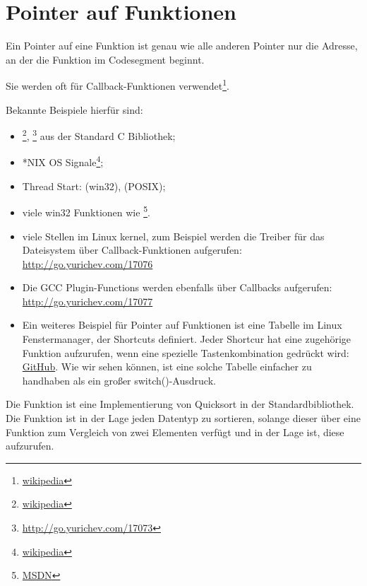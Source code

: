 \newcommand{\comp}{\TT{comp()}\xspace}
\section{Pointer auf Funktionen}
\label{sec:pointerstofunctions}

\myindex{\CLanguageElements!\Pointers}
Ein Pointer auf eine Funktion ist genau wie alle anderen Pointer nur die Adresse, an der die Funktion im Codesegment
beginnt.

Sie werden oft für Callback-Funktionen verwendet\footnote{\href{http://go.yurichev.com/17071}{wikipedia}}.

Bekannte Beispiele hierfür sind:

\begin{itemize}
\item \qsort\footnote{\href{http://go.yurichev.com/17072}{wikipedia}},
{}\footnote{\url{http://go.yurichev.com/17073}} aus der Standard C Bibliothek; 

\item *NIX OS Signale\footnote{\href{http://go.yurichev.com/17074}{wikipedia}};

\item Thread Start:  (win32),  (POSIX);

\item viele win32 Funktionen wie \footnote{\href{http://go.yurichev.com/17075}{MSDN}}.

\item viele Stellen im Linux kernel, zum Beispiel werden die Treiber für das Dateisystem über Callback-Funktionen
aufgerufen:
\url{http://go.yurichev.com/17076}

\item Die GCC Plugin-Functions werden ebenfalls über Callbacks aufgerufen: 
\url{http://go.yurichev.com/17077}
\item Ein weiteres Beispiel für Pointer auf Funktionen ist eine Tabelle im  Linux Fenstermanager, der Shortcuts
definiert. Jeder Shortcur hat eine zugehörige Funktion aufzurufen, wenn eine spezielle Tastenkombination gedrückt wird:
\href{http://go.yurichev.com/17078}{GitHub}. Wie wir sehen können, ist eine solche Tabelle einfacher zu handhaben als
ein großer switch()-Ausdruck.
\end{itemize}

Die Funktion \qsort ist eine Implementierung von Quicksort in der \CCpp Standardbibliothek.
Die Funktion ist in der Lage jeden Datentyp zu sortieren, solange dieser über eine Funktion zum Vergleich von zwei
Elementen verfügt und \qsort in der Lage ist, diese aufzurufen.

